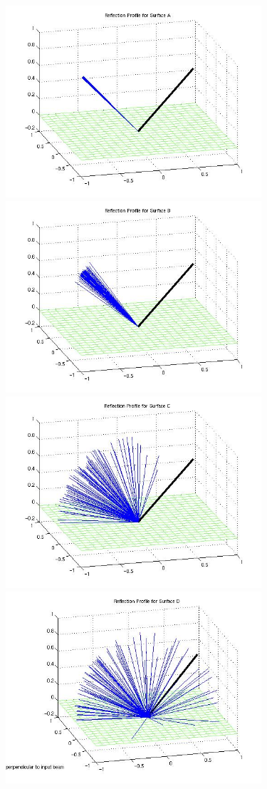 \begin{description}
      \begin{figure}[!ht]
        \includegraphics[width=95mm]{figs/sda/reflection1_sda.jpg}
        \includegraphics[width=95mm]{figs/sda/reflection2_sda.jpg}
        \includegraphics[width=95mm]{figs/sda/reflection3_sda.jpg}
        \includegraphics[width=95mm]{figs/sda/reflection4_sda.jpg}

\end{figure}
\end{description}
